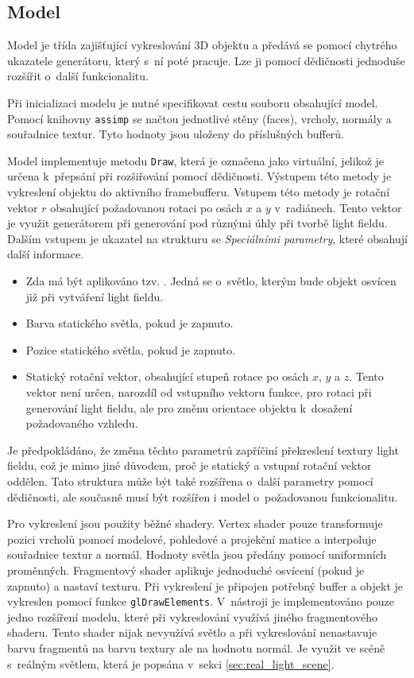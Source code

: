 \subsection{Model}
\label{sec:model_impl}
Model je třída zajišťující vykreslování 3D objektu a předává se pomocí chytrého ukazatele generátoru, který s~ní poté pracuje. Lze ji pomocí dědičnosti jednoduše rozšířit o~další funkcionalitu. 

Při inicializaci modelu je nutné specifikovat cestu souboru obsahující model. Pomocí knihovny \texttt{assimp} se načtou jednotlivé stěny (faces), vrcholy, normály a souřadnice textur. Tyto hodnoty jsou uloženy do příslušných bufferů. 

Model implementuje metodu \texttt{Draw}, která je označena jako virtuální, jelikož je určena k~přepsání při rozšiřování pomocí dědičnosti. Výstupem této metody je vykreslení objektu do aktivního framebufferu. Vstupem této metody je rotační vektor $r$ obsahující požadovanou rotaci po osách $x$ a $y$ v~radiánech. Tento vektor je využit generátorem při generování pod různými úhly při tvorbě light fieldu. Dalším vstupem je ukazatel na strukturu se \emph{Speciálními parametry}, které obsahují další informace.
\begin{itemize}
    \item Zda má být aplikováno tzv. . Jedná se o~světlo, kterým bude objekt osvícen již při vytváření light fieldu.
    \item Barva statického světla, pokud je zapnuto.
    \item Pozice statického světla, pokud je zapnuto.
    \item Statický rotační vektor, obsahující stupeň rotace po osách $x$, $y$ a $z$. Tento vektor není určen, narozdíl od vstupního vektoru funkce, pro rotaci při generování light fieldu, ale pro změnu orientace objektu k~dosažení požadovaného vzhledu.
\end{itemize}
Je předpokládáno, že změna těchto parametrů zapříčiní překreslení textury light fieldu, což je mimo jiné důvodem, proč je statický a vstupní rotační vektor oddělen. Tato struktura může být také rozšířena o~další parametry pomocí dědičnosti, ale současně musí být rozšířen i model o~požadovanou funkcionalitu.

Pro vykreslení jsou použity běžné shadery. Vertex shader pouze transformuje pozici vrcholů pomocí modelové, pohledové a projekční matice a interpoluje souřadnice textur a normál. Hodnoty světla jsou předány pomocí uniformních proměnných. Fragmentový shader aplikuje jednoduché osvícení (pokud je zapnuto) a nastaví texturu. Při vykreslení je připojen potřebný buffer a objekt je vykreslen pomocí funkce \texttt{glDrawElements}.
\label{sec:implemented_extensions}
V~nástroji je implementováno pouze jedno rozšíření modelu, které při vykreslování využívá jiného fragmentového shaderu. Tento shader nijak nevyužívá světlo a při vykreslování nenastavuje barvu fragmentů na barvu textury ale na hodnotu normál. Je využit ve scéně s~reálným světlem, která je popsána v~sekci \ref{sec:real_light_scene}. 

